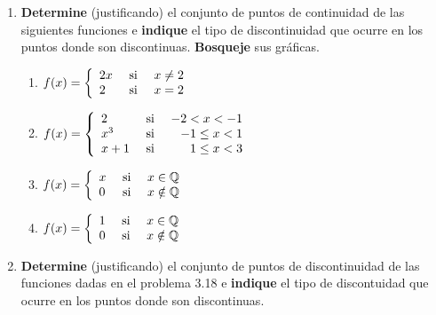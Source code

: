 \documentclass[12pt]{article}
\begin{document}
\begin{enumerate}
    \item \textbf{Determine} (justificando) el conjunto de puntos de continuidad de las siguientes funciones e \textbf{indique} el tipo de discontinuidad que ocurre en los puntos donde son discontinuas. \textbf{Bosqueje} sus gráficas.
    \begin{enumerate}
        \item $f(x)=\left\{
            \begin{array}{lcr}
                2x & \textup{ si } & x\neq 2 \\
                2 & \textup{ si } & x=2\\
            \end{array}
        \right.$
        \item $f(x)=\left\{
            \begin{array}{lcr}
                2 & \textup{ si } & -2<x<-1 \\
                x^3 & \textup{ si } & -1\leq x<1 \\
                x+1 & \textup{ si } & 1\leq x<3 \\
            \end{array}
        \right.$
        \item $f(x)=\left\{
            \begin{array}{lcr}
                x & \textup{ si } & x\in\mathbb{Q} \\
                0 & \textup{ si } & x\notin\mathbb{Q} \\
            \end{array}
        \right.$
        \item $f(x)=\left\{
            \begin{array}{lcr}
                1 & \textup{ si } & x\in\mathbb{Q} \\
                0 & \textup{ si } & x\notin\mathbb{Q} \\
            \end{array}
        \right.$
    \end{enumerate}

    \begin{sol}
    \end{sol}

    \item \textbf{Determine} (justificando) el conjunto de puntos de discontinuidad de las funciones dadas en el problema 3.18 e \textbf{indique} el tipo de discontuidad que ocurre en los puntos donde son discontinuas.
    

\end{enumerate}
\end{document}
